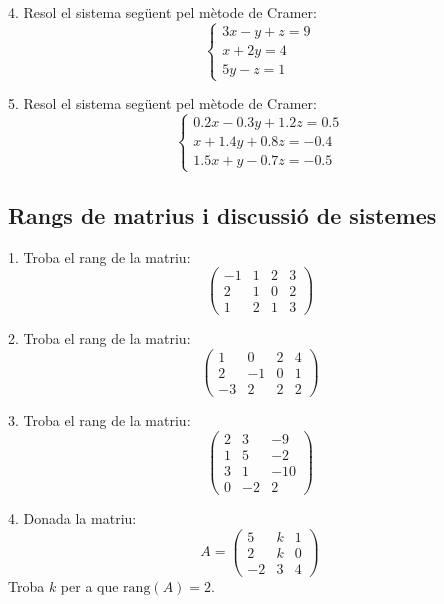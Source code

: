 \documentclass[12pt]{article}
\begin{document}
\begin{exercici}
4. Resol el sistema següent pel mètode de Cramer:
\[
\begin{cases}
3x - y + z = 9 \\
x + 2y = 4 \\
5y - z = 1
\end{cases}
\]
\end{exercici}

\begin{exercici}
5. Resol el sistema següent pel mètode de Cramer:
\[
\begin{cases}
0.2x - 0.3y + 1.2z = 0.5 \\
x + 1.4y + 0.8z = -0.4 \\
1.5x + y - 0.7z = -0.5
\end{cases}
\]
\end{exercici}


\subsection*{Rangs de matrius i discussió de sistemes}

\begin{exercici}
1. Troba el rang de la matriu:
\[
\begin{pmatrix}
-1 & 1 & 2 & 3 \\
2 & 1 & 0 & 2 \\
1 & 2 & 1 & 3
\end{pmatrix}
\]
\end{exercici}

\begin{exercici}
2. Troba el rang de la matriu:
\[
\begin{pmatrix}
1 & 0 & 2 & 4 \\
2 & -1 & 0 & 1 \\
-3 & 2 & 2 & 2
\end{pmatrix}
\]
\end{exercici}

\begin{exercici}
3. Troba el rang de la matriu:
\[
\begin{pmatrix}
2 & 3 & -9 \\
1 & 5 & -2 \\
3 & 1 & -10 \\
0 & -2 & 2
\end{pmatrix}
\]
\end{exercici}

\begin{exercici}
4. Donada la matriu:
\[
A =
\begin{pmatrix}
5 & k & 1 \\
2 & k & 0 \\
-2 & 3 & 4
\end{pmatrix}
\]
Troba \(k\) per a que \(\text{rang}(A) = 2\).
\end{exercici}
\end{document}
